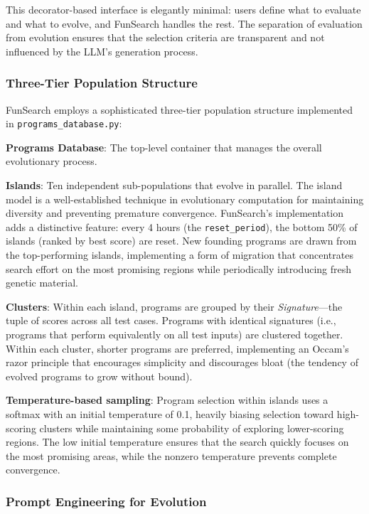 This decorator-based interface is elegantly minimal: users define what to evaluate and what to evolve, and FunSearch handles the rest. The separation of evaluation from evolution ensures that the selection criteria are transparent and not influenced by the LLM's generation process.

\subsubsection{Three-Tier Population Structure}

FunSearch employs a sophisticated three-tier population structure implemented in \texttt{programs\_database.py}:

\textbf{Programs Database}: The top-level container that manages the overall evolutionary process.

\textbf{Islands}: Ten independent sub-populations that evolve in parallel. The island model is a well-established technique in evolutionary computation for maintaining diversity and preventing premature convergence. FunSearch's implementation adds a distinctive feature: every 4 hours (the \texttt{reset\_period}), the bottom 50\% of islands (ranked by best score) are reset. New founding programs are drawn from the top-performing islands, implementing a form of migration that concentrates search effort on the most promising regions while periodically introducing fresh genetic material.

\textbf{Clusters}: Within each island, programs are grouped by their \emph{Signature}---the tuple of scores across all test cases. Programs with identical signatures (i.e., programs that perform equivalently on all test inputs) are clustered together. Within each cluster, shorter programs are preferred, implementing an Occam's razor principle that encourages simplicity and discourages bloat (the tendency of evolved programs to grow without bound).

\textbf{Temperature-based sampling}: Program selection within islands uses a softmax with an initial temperature of 0.1, heavily biasing selection toward high-scoring clusters while maintaining some probability of exploring lower-scoring regions. The low initial temperature ensures that the search quickly focuses on the most promising areas, while the nonzero temperature prevents complete convergence.

\subsubsection{Prompt Engineering for Evolution}

